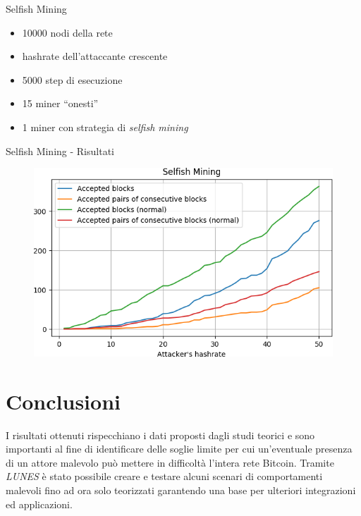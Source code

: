 \documentclass{beamer}
\begin{document}
\begin{frame}{Selfish Mining}
	\begin{itemize}
    	\item 10000 nodi della rete
        \item hashrate dell'attaccante crescente
        \item 5000 step di esecuzione
        \item 15 miner ``onesti''
        \item 1 miner con strategia di \textit{selfish mining}
    \end{itemize}
\end{frame}

\begin{frame}{Selfish Mining - Risultati}
	\begin{figure}
		\centering
        \includegraphics[width=\linewidth]{./images/selfishtest.png}
	\end{figure}
\end{frame}


\section{Conclusioni}

\begin{frame}[plain]    
   	I risultati ottenuti rispecchiano i dati proposti dagli studi teorici e sono importanti al fine di identificare delle soglie limite per cui un'eventuale presenza di un attore malevolo può mettere in difficoltà l'intera rete Bitcoin.
    \vfill    
    Tramite \textit{LUNES} è stato possibile creare e testare alcuni scenari di comportamenti malevoli fino ad ora solo teorizzati garantendo una base per ulteriori integrazioni ed applicazioni.
\end{frame}
\end{document}
